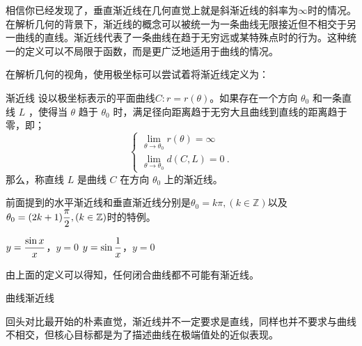 相信你已经发现了，垂直渐近线在几何直觉上就是斜渐近线的斜率为$\infty$时的情况。在解析几何的背景下，渐近线的概念可以被统一为一条曲线无限接近但不相交于另一曲线的直线。渐近线代表了一条曲线在趋于无穷远或某特殊点时的行为。这种统一的定义可以不局限于函数，而是更广泛地适用于曲线的情况。

在解析几何的视角，使用极坐标可以尝试着将渐近线定义为：

\begin{definition}{渐近线}
设以极坐标表示的平面曲线$C:r=r(\theta)$。如果存在一个方向  $\theta_0$  和一条直线  $L$ ，使得当  $\theta$  趋于  $\theta_0$  时，满足径向距离趋于无穷大且曲线到直线的距离趋于零，即；
\begin{equation}
\begin{cases}
\displaystyle\lim_{\theta \to \theta_0} r(\theta) = \infty\\
\displaystyle\lim_{\theta \to \theta_0} d(C, L) = 0~.
\end{cases}
\end{equation}
那么，称直线  $L$  是曲线  $C$  在方向  $\theta_0$  上的渐近线。
\end{definition}

前面提到的水平渐近线和垂直渐近线分别是$\theta_0=k\pi,(k\in\mathbb{Z})$以及$\displaystyle\theta_0=(2k+1){\pi\over2},(k\in\mathbb{Z})$时的特例。


$\displaystyle y={\sin x\over x}$，$y=0$
$\displaystyle y=\sin {1\over x}$，$y=0$

由上面的定义可以得知，任何闭合曲线都不可能有渐近线。

曲线渐近线

回头对比最开始的朴素直觉，渐近线并不一定要求是直线，同样也并不要求与曲线不相交，但核心目标都是为了描述曲线在极端值处的近似表现。